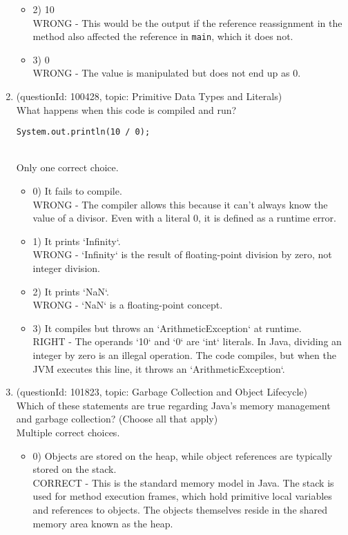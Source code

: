 \documentclass[12pt]{article}
\begin{document}
\begin{enumerate}[label=(\arabic*)]
\begin{itemize}
\item 2) 10
 \\ 
WRONG - This would be the output if the reference reassignment in the method also affected the reference in \verb|main|, which it does not.

\item 3) 0
 \\ 
WRONG - The value is manipulated but does not end up as 0.

\end{itemize}
\item (questionId: 100428, topic: Primitive Data Types and Literals) \\ 
What happens when this code is compiled and run?
\begin{verbatim}
System.out.println(10 / 0);
\end{verbatim}
\\ \noindent Only one correct choice. 
\begin{itemize}
\item 0) It fails to compile.
 \\ 
WRONG - The compiler allows this because it can't always know the value of a divisor. Even with a literal 0, it is defined as a runtime error.

\item 1) It prints `Infinity`.
 \\ 
WRONG - `Infinity` is the result of floating-point division by zero, not integer division.

\item 2) It prints `NaN`.
 \\ 
WRONG - `NaN` is a floating-point concept.

\item 3) It compiles but throws an `ArithmeticException` at runtime.
 \\ 
RIGHT - The operands `10` and `0` are `int` literals. In Java, dividing an integer by zero is an illegal operation. The code compiles, but when the JVM executes this line, it throws an `ArithmeticException`.

\end{itemize}
\item (questionId: 101823, topic: Garbage Collection and Object Lifecycle) \\ 
Which of these statements are true regarding Java's memory management and garbage collection? (Choose all that apply)
\\ \noindent Multiple correct choices. 
\begin{itemize}
\item 0) Objects are stored on the heap, while object references are typically stored on the stack.
 \\ 
CORRECT - This is the standard memory model in Java. The stack is used for method execution frames, which hold primitive local variables and references to objects. The objects themselves reside in the shared memory area known as the heap.


\end{itemize}
\end{enumerate}
\end{document}
